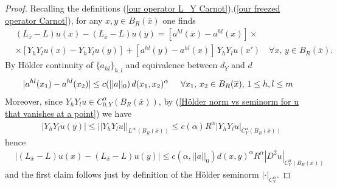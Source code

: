 \documentclass{article}
\numberwithin{equation}{section}
\begin{document}
\begin{proof}
    Recalling the definitions (\ref{our operator L_Y Carnot}),(\ref{our freezed operator Carnot}), for any $x,y \in B_R(\overline{x})$ one finds    \begin{align*}
        & (L_{\overline{x}}-L)u(x)-(L_{\overline{x}}-L) u(y) = [a^{hl}(\overline{x})-a^{hl}(x)] \times \\
        & \times [Y_h Y_l u(x)- Y_h Y_l u(y)]+ [a^{hl}(y)-a^{hl}(x)] \, Y_h Y_l u(x') \quad \forall x, \, y \in B_R(\overline{x}).
    \end{align*}
    By Hölder continuity of $\{a_{hl}\}_{h,l}$ and equivalence between $d_Y$ and $d$
    \begin{equation*}
        |a^{hl}(x_1)-a^{hl}(x_2)| \leq c(||a||_0) \, d(x_1,x_2)^{\alpha} \hspace{5mm} \forall x_1,\, x_2 \in B_R(\overline{x}), \, 1 \leq h,l \leq m
    \end{equation*}
    Moreover, since $Y_h Y_l u \in C^{\alpha}_{0,Y}(B_R(\overline{x}))$, by (\ref{Hölder norm vs seminorm for u that vanishes at a point}) we have
    \begin{align}
    & \label{Hölder estimate Y_h Y_l u}
    |Y_h Y_l u(y)| \leq ||Y_h Y_l u||_{L^{\infty}(B_R(\overline{x}))} \leq c(\alpha) R^{\alpha} |Y_h Y_l u|_{C^{\alpha}_Y(B_R(\overline{x}))} 
\end{align}
    hence
    \begin{align*}
        & |(L_{\overline{x}}-L)u(x)-(L_{\overline{x}}-L) u(y)| \leq c(\alpha, ||a||_0) d(x,y)^{\alpha} R^{\alpha} |D^2 u|_{C^{\alpha}_Y(B_R(\overline{x}))}
    \end{align*}
    and the first claim follows just by definition of the Hölder seminorm $|\cdot|_{C^{\alpha}_Y}$.


\end{proof}
\end{document}
